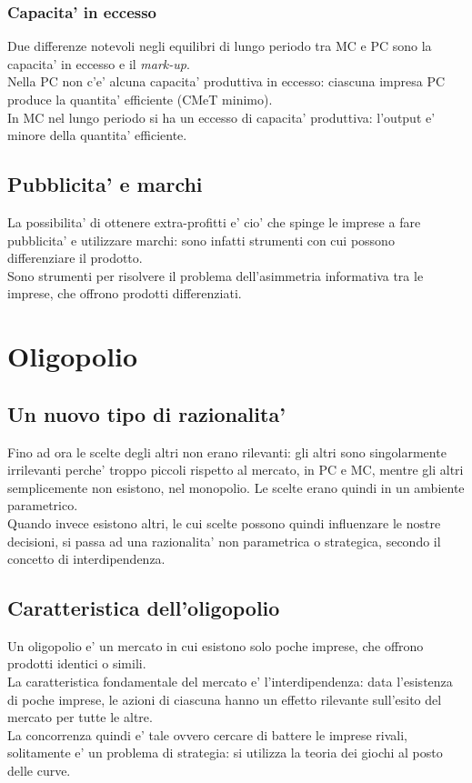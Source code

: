 \documentclass{report}
\begin{document}
	\subsubsection{Capacita' in eccesso}
	Due differenze notevoli negli equilibri di lungo periodo tra MC e PC sono la capacita' in eccesso e il \textit{mark-up}.
	\medskip \\Nella PC non c'e' alcuna capacita' produttiva in eccesso: ciascuna impresa PC produce la quantita' efficiente (CMeT minimo).
	\medskip \\In MC nel lungo periodo si ha un eccesso di capacita' produttiva: l'output e' minore della quantita' efficiente.
	\subsection{Pubblicita' e marchi}
	La possibilita' di ottenere extra-profitti e' cio' che spinge le imprese a fare pubblicita' e utilizzare marchi: sono infatti strumenti con cui possono differenziare il prodotto.
	\medskip \\Sono strumenti per risolvere il problema dell'asimmetria informativa tra le imprese, che offrono prodotti differenziati.
	\section{Oligopolio}
	\subsection{Un nuovo tipo di razionalita'}
	Fino ad ora le scelte degli altri non erano rilevanti: gli altri sono singolarmente irrilevanti perche' troppo piccoli rispetto al mercato, in PC e MC, mentre gli altri semplicemente non esistono, nel monopolio. Le scelte erano quindi in un ambiente parametrico.
	\medskip \\
	Quando invece esistono altri, le cui scelte possono quindi influenzare le nostre decisioni, si passa ad una razionalita' non parametrica o strategica, secondo il concetto di interdipendenza.
	\subsection{Caratteristica dell'oligopolio}
	Un oligopolio e' un mercato in cui esistono solo poche imprese, che offrono prodotti identici o simili.\medskip \\La caratteristica fondamentale del mercato e' l'interdipendenza: data l'esistenza di poche imprese, le azioni di ciascuna hanno un effetto rilevante sull'esito del mercato per tutte le altre.\medskip \\La concorrenza quindi e' tale ovvero cercare di battere le imprese rivali, solitamente e' un problema di strategia: si utilizza la teoria dei giochi al posto delle curve.
\end{document}
